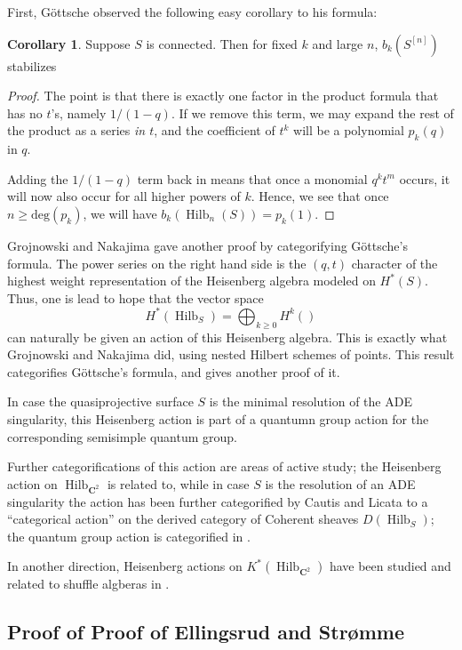 \documentclass{amsart}[12pt]
\theoremstyle{definition}
\newtheorem{corollary}[dummy]{Corollary}
\newcommand{\C}{\mathbf{C}}
\DeclareMathOperator{\Hilb}{Hilb}
\newcommand{\HG}{\Hilb}
\begin{document}
First, G\"ottsche observed the following easy corollary to his formula:
\begin{corollary}  Suppose $S$ is connected.
Then for fixed $k$ and large $n$, $b_{k}(S^{[n]})$ stabilizes
\end{corollary}

\begin{proof}
The point is that there is exactly one factor in the product formula that has no $t$'s, namely $1/(1-q)$.  If we remove this term, we may expand the rest of the product as a series \emph{in $t$}, and the coefficient of $t^k$ will be a polynomial $p_k(q)$ in $q$.  

Adding the $1/(1-q)$ term back in means that once a monomial $q^kt^m$ occurs, it will now also occur for all higher powers of $k$.  Hence, we see that once $n\geq\text{deg}(p_k)$, we will have $b_k(\Hilb_n(S))=p_k(1)$.
\end{proof}

Grojnowski and Nakajima \cite{grojnowski, nakajimaheisenberg} gave another proof by categorifying G\"ottsche's formula.  The power series on the right hand side is the $(q,t)$ character of the highest weight representation of the Heisenberg algebra modeled on $H^*(S)$.  Thus, one is lead to hope that the vector space 
$$H^*(\HG_S)=\bigoplus_{k\geq 0} H^k()$$
can naturally be given an action of this Heisenberg algebra.  This is exactly what Grojnowski and Nakajima did, using nested Hilbert schemes of points.  This result categorifies G\"ottsche's formula, and gives another proof of it.

In case the quasiprojective surface $S$ is the minimal resolution of the ADE singularity, this Heisenberg action is part of a quantumn group action for the corresponding semisimple quantum group.

Further categorifications of this action are areas of active study; the Heisenberg action on $\HG_{\C^2}$ is related to, while in case $S$ is the resolution of an ADE singularity the action has been further categorified by Cautis and Licata \cite{CL} to a ``categorical action'' on the derived category of Coherent sheaves $D(\Hilb_S)$; the quantum group action is categorified in \cite{CL2}.

In another direction, Heisenberg actions on $K^*(\HG_{\C^2})$ have been studied and related to shuffle algberas in \cite{FT, SV}.




\subsection{Proof of \texorpdfstring{Proof of Ellingsrud and Str\o mme}{Proof of Ellingsrud and Stromme}}
\end{document}
